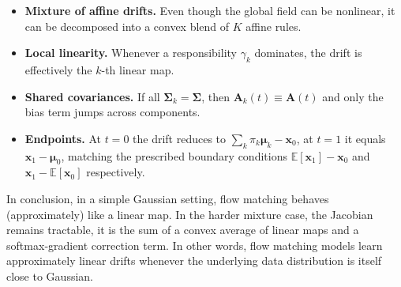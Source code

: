 \begin{itemize}
    \itemsep0em
    \item \textbf{Mixture of affine drifts.}  Even though the global field can be nonlinear, it can be decomposed into a convex blend of $K$ affine rules.
    
    \item \textbf{Local linearity.}  Whenever a responsibility $\gamma_k$ dominates, the drift is effectively the $k$-th linear map.
    
    \item \textbf{Shared covariances.} If all $\boldsymbol \Sigma_k = \boldsymbol \Sigma$, then $\mathbf A_k(t) \equiv \mathbf A(t)$ and only the bias term jumps across components.
    
    \item \textbf{Endpoints.} At $t=0$ the drift reduces to $\sum_k \pi_k \boldsymbol \mu_k - \mathbf x_0$, at $t=1$ it equals $\mathbf x_1 - \boldsymbol \mu_0$, matching the prescribed boundary conditions $\mathbb{E}[\mathbf x_1] - \mathbf x_0$ and $\mathbf x_1 - \mathbb{E}[\mathbf x_0]$ respectively.
\end{itemize}

In conclusion, in a simple Gaussian setting, flow matching behaves (approximately) like a linear map. In the harder mixture case, the Jacobian remains tractable, it is the sum of a convex average of linear maps and a softmax‑gradient correction term. In other words, flow matching models learn approximately linear drifts whenever the underlying data distribution is itself close to Gaussian.
